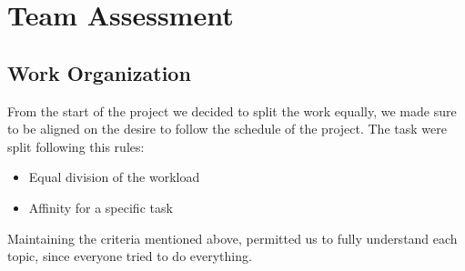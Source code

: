 \documentclass{article}
\begin{document}
\section{Team Assessment}

\subsection{Work Organization}
From the start of the project we decided to split the work equally, we made sure to be aligned on the desire to follow the schedule of the project. The task were split following this rules:
\begin{itemize}
    \item Equal division of the workload
    \item Affinity for a specific task
\end{itemize}
Maintaining the criteria mentioned above, permitted us to fully understand each topic, since everyone tried to do everything.
\end{document}
